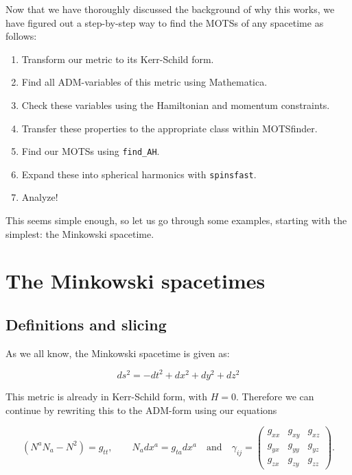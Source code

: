 \documentclass[twoside, openright]{RadboudReport}
\begin{document}
Now that we have thoroughly discussed the background of why this works, we have figured out a step-by-step way to find the MOTSs of any spacetime as follows:

\begin{enumerate}
	\item Transform our metric to its Kerr-Schild form.
	\item Find all ADM-variables of this metric using Mathematica.
	\item Check these variables using the Hamiltonian and momentum constraints.
	\item Transfer these properties to the appropriate class within MOTSfinder.
	\item Find our MOTSs using \verb*|find_AH|.
	\item Expand these into spherical harmonics with \verb*|spinsfast|.
	\item Analyze!
\end{enumerate}

This seems simple enough, so let us go through some examples, starting with the simplest: the Minkowski spacetime.

\section{The Minkowski spacetimes}

\subsection{Definitions and slicing}

As we all know, the Minkowski spacetime is given as:

\begin{equation}
	ds^2 = -dt^2 + dx^2 + dy^2 + dz^2
\end{equation}

This metric is already in Kerr-Schild form, with $H = 0$. Therefore we can continue by rewriting this to the ADM-form using our equations

\begin{equation}
	(N^aN_a-N^2) = g_{tt}, \qquad N_adx^a = g_{ta}dx^a \quad \text{and} \quad \gamma_{ij} = 
	\begin{pmatrix}
		g_{xx} & g_{xy} & g_{xz} \\
		g_{yx} & g_{yy} & g_{yz} \\
		g_{zx} & g_{zy} & g_{zz} 
	\end{pmatrix}.
\end{equation}
\end{document}
